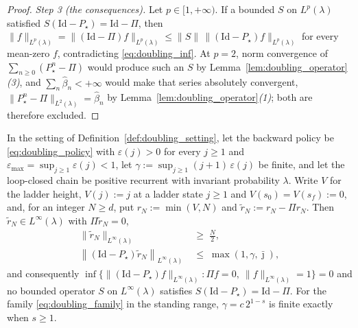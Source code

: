 \begin{proof}
\emph{Step 3 (the consequences).} Let $p\in[1,+\infty)$. If a bounded $S$ on $L^p(\lambda)$
satisfied $S(\mathrm{Id}-P_\star)=\mathrm{Id}-\Pi$, then
$\|f\|_{L^p(\lambda)}=\|(\mathrm{Id}-\Pi)f\|_{L^p(\lambda)}\leq\|S\|\,\|(\mathrm{Id}-P_\star)f\|_{L^p(\lambda)}$
for every mean-zero $f$, contradicting \eqref{eq:doubling_inf}. At $p=2$, norm convergence of
$\sum_{n\geq0}(P_\star^n-\Pi)$ would produce such an $S$ by
Lemma~\ref{lem:doubling_operator}\emph{(3)}, and $\sum_n\widehat\beta_n<+\infty$ would make
that series absolutely convergent, $\|P_\star^n-\Pi\|_{L^2(\lambda)}=\widehat\beta_n$ by
Lemma~\ref{lem:doubling_operator}\emph{(1)}; both are therefore excluded.
\end{proof}

\begin{lemma}\label{lem:doubling_ramp}
In the setting of Definition~\ref{def:doubling_setting}, let the backward policy be
\eqref{eq:doubling_policy} with $\varepsilon(j)>0$ for every $j\geq1$ and
$\varepsilon_{\max}=\sup_{j\geq1}\varepsilon(j)<1$, let
$\gamma:=\sup_{j\geq1}(j+1)\,\varepsilon(j)$ be finite, and let the loop-closed chain be
positive recurrent with invariant probability $\lambda$. Write $V$ for the ladder height,
$V(j):=j$ at a ladder state $j\geq1$ and $V(s_0)=V(s_f):=0$, and, for an integer $N\geq d$,
put $r_N:=\min(V,N)$ and $\tilde r_N:=r_N-\Pi r_N$. Then $\tilde r_N\in L^\infty(\lambda)$
with $\Pi\tilde r_N=0$,
\begin{equation}\label{eq:doubling_ramp}
\begin{aligned}
    \|\tilde r_N\|_{L^\infty(\lambda)}\;&\geq\;\frac N2,\\
    \left\|\left(\mathrm{Id}-P_\star\right)\tilde r_N\right\|_{L^\infty(\lambda)}
    \;&\leq\;\max\left(1,\gamma,\bar\jmath\right),
\end{aligned}
\end{equation}
and consequently
$\inf\bigl\{\|(\mathrm{Id}-P_\star)f\|_{L^\infty(\lambda)}:\Pi f=0,\ \|f\|_{L^\infty(\lambda)}=1\bigr\}=0$
and no bounded operator $S$ on $L^\infty(\lambda)$ satisfies
$S(\mathrm{Id}-P_\star)=\mathrm{Id}-\Pi$. For the family \eqref{eq:doubling_family} in the
standing range, $\gamma=c\,2^{1-s}$ is finite exactly when $s\geq1$.
\end{lemma}

